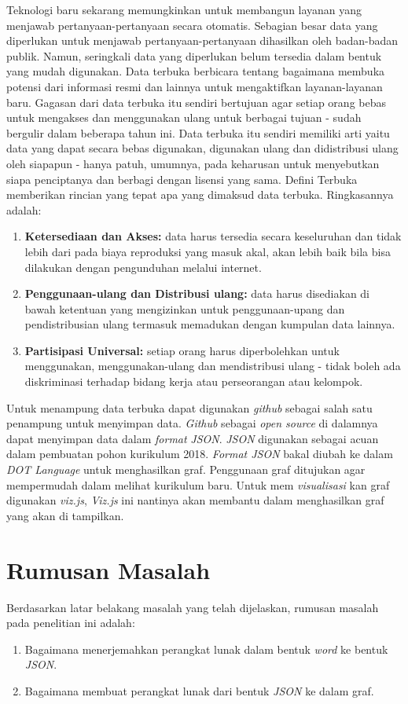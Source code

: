 \documentclass[a4paper,twoside]{article}
\begin{document}
Teknologi baru sekarang memungkinkan untuk membangun layanan yang menjawab pertanyaan-pertanyaan secara otomatis. Sebagian besar data yang diperlukan untuk menjawab pertanyaan-pertanyaan dihasilkan oleh badan-badan publik. Namun, seringkali data yang diperlukan belum tersedia dalam bentuk yang mudah digunakan. Data terbuka berbicara tentang bagaimana membuka potensi dari informasi resmi dan lainnya untuk mengaktifkan layanan-layanan baru. Gagasan dari data terbuka itu sendiri bertujuan agar setiap orang bebas untuk mengakses dan menggunakan ulang untuk berbagai tujuan - sudah bergulir dalam beberapa tahun ini. Data terbuka itu sendiri memiliki arti yaitu data yang dapat secara bebas digunakan, digunakan ulang dan didistribusi ulang oleh siapapun - hanya patuh, umumnya, pada keharusan untuk menyebutkan siapa penciptanya dan berbagi dengan lisensi yang sama. Defini Terbuka memberikan rincian yang tepat apa yang dimaksud data terbuka. Ringkasannya adalah:
\begin{enumerate}
\item \textbf{Ketersediaan dan Akses:} data harus tersedia secara keseluruhan dan tidak lebih dari pada biaya reproduksi yang masuk akal, akan lebih baik bila bisa dilakukan dengan pengunduhan melalui internet.
\item \textbf{Penggunaan-ulang dan Distribusi ulang:} data harus disediakan di bawah ketentuan yang mengizinkan untuk penggunaan-upang dan pendistribusian ulang termasuk memadukan dengan kumpulan data lainnya.
\item \textbf{Partisipasi Universal:} setiap orang harus diperbolehkan untuk menggunakan, menggunakan-ulang dan mendistribusi ulang - tidak boleh ada diskriminasi terhadap bidang kerja atau perseorangan atau kelompok.
\end{enumerate}

Untuk menampung data terbuka dapat digunakan \textit{github} sebagai salah satu penampung untuk menyimpan data. \textit{Github} sebagai \textit{open source} di dalamnya dapat menyimpan data dalam \textit{format} \textit{JSON}. \textit{JSON} digunakan sebagai acuan dalam pembuatan pohon kurikulum 2018. \textit{Format JSON} bakal diubah ke dalam \textit{DOT Language} untuk menghasilkan graf. Penggunaan graf ditujukan agar mempermudah dalam melihat kurikulum baru. Untuk mem \textit{visualisasi} kan graf digunakan \textit{viz.js}, \textit{Viz.js} ini nantinya akan membantu dalam menghasilkan graf yang akan di tampilkan.
\section{Rumusan Masalah}
Berdasarkan latar belakang masalah yang telah dijelaskan, rumusan masalah pada penelitian ini adalah:
\begin{enumerate}
\item Bagaimana menerjemahkan perangkat lunak dalam bentuk \textit{word} ke bentuk \textit{JSON}.
\item Bagaimana membuat perangkat lunak dari bentuk \textit{JSON} ke dalam graf.
\end{enumerate} 
\end{document}
